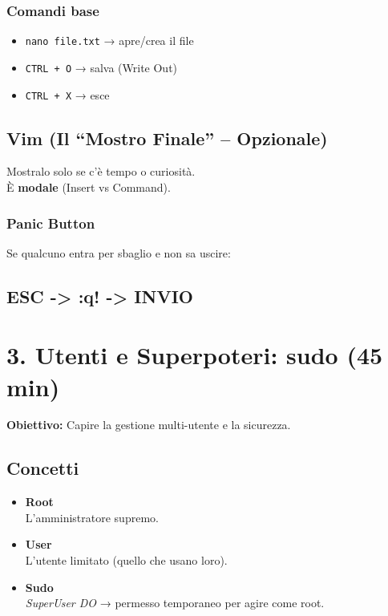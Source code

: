\documentclass[11pt,a4paper]{article}
\providecommand{\tightlist}{%
  \setlength{\itemsep}{0pt}\setlength{\parskip}{0pt}}
\begin{document}
\subsubsection{Comandi base}\label{comandi-base}

\begin{itemize}
\tightlist
\item
  \texttt{nano\ file.txt} → apre/crea il file
\item
  \texttt{CTRL\ +\ O} → salva (Write Out)
\item
  \texttt{CTRL\ +\ X} → esce
\end{itemize}

\subsection{Vim (Il ``Mostro Finale'' --
Opzionale)}\label{vim-il-mostro-finale-opzionale}

Mostralo solo se c'è tempo o curiosità.\\
È \textbf{modale} (Insert vs Command).

\subsubsection{Panic Button}\label{panic-button}

Se qualcuno entra per sbaglio e non sa uscire:

\subsection{ESC -\textgreater{} :q! -\textgreater{}
INVIO}\label{esc---q---invio}

\section{3. Utenti e Superpoteri: sudo (45
min)}\label{utenti-e-superpoteri-sudo-45-min}

\textbf{Obiettivo:} Capire la gestione multi-utente e la sicurezza.

\subsection{Concetti}\label{concetti}

\begin{itemize}
\item
  \textbf{Root}\\
  L'amministratore supremo.
\item
  \textbf{User}\\
  L'utente limitato (quello che usano loro).
\item
  \textbf{Sudo}\\
  \emph{SuperUser DO} → permesso temporaneo per agire come root.
\end{itemize}
\end{document}
